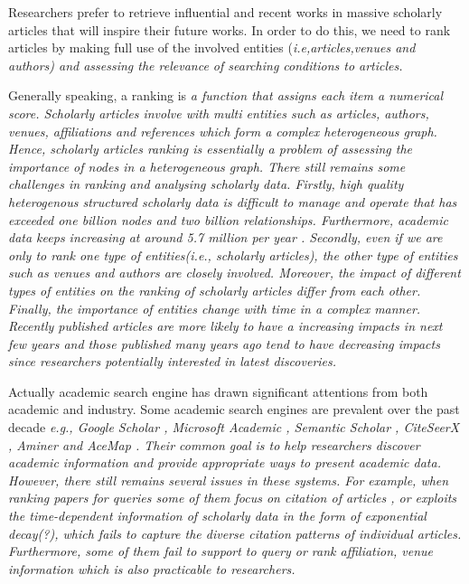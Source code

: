 \documentclass[conference]{IEEEtran}
\begin{document}
\par
Researchers prefer to retrieve influential and recent works in massive scholarly articles that will inspire their future works. In order to do this, we need to rank articles by making full use of the involved entities (\itshape i.e,\upshape articles,venues and authors) and assessing the relevance of searching conditions to articles.

\par
Generally speaking, a ranking is \itshape a function that assigns each item a numerical score. \upshape Scholarly articles involve with multi entities such as articles, authors, venues, affiliations and references which form a complex heterogeneous graph. Hence, scholarly articles ranking is essentially a problem of assessing the importance of nodes in a heterogeneous graph. There still remains some challenges in ranking and analysing scholarly data. Firstly, high quality heterogenous structured scholarly data is difficult to manage and operate that has exceeded one billion nodes and two billion relationships. Furthermore, academic data keeps increasing at around 5.7 million per year \cite{sinha2015overview}. Secondly, even if we are only to rank one type of entities(\itshape i.e., \upshape scholarly articles), the other type of entities such as venues and authors are closely involved. Moreover, the impact of different types of entities on the ranking of scholarly articles differ from each other. Finally, the importance of entities change with time in a complex manner. Recently published articles are more likely to have a increasing impacts in next few years and those published many years ago tend to have decreasing impacts since researchers potentially interested in latest discoveries.

\par
Actually academic search engine has drawn significant attentions from both academic and industry. Some academic search engines are prevalent over the past decade \itshape e.g., \upshape Google Scholar \cite{googlescholar}, Microsoft Academic \cite{sinha2015overview}, Semantic Scholar \cite{semantic}, CiteSeerX \cite{li2006citeseerx}, Aminer \cite{tang2008arnetminer} and AceMap \cite{tan2016acemap}. Their common goal is to help researchers discover academic information and provide appropriate ways to present academic data. However, there still remains several issues in these systems. For example, when ranking papers for queries some of them focus on citation of articles \cite{tang2008arnetminer,tan2016acemap}, or exploits the time-dependent information of scholarly data in the form of exponential decay(?), which fails to capture the diverse citation patterns of individual articles. Furthermore, some of them fail to support to query or rank affiliation, venue information which is also practicable to researchers.
\end{document}
